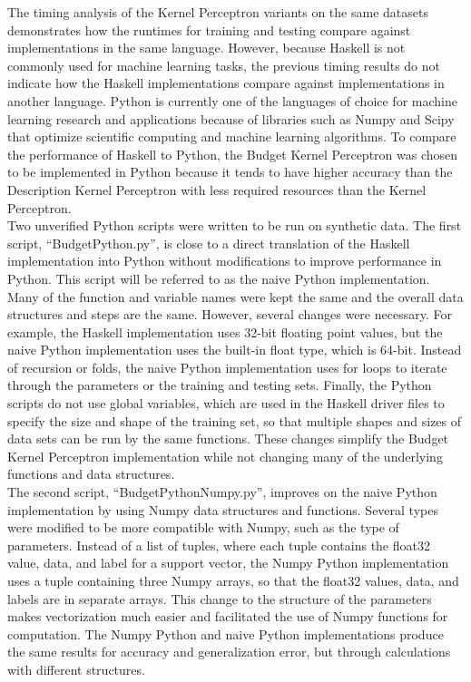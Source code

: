 The timing analysis of the Kernel Perceptron variants on the same datasets demonstrates how the runtimes for training and testing compare against implementations in the same language. However, because Haskell is not commonly used for machine learning tasks, the previous timing results do not indicate how the Haskell implementations compare against implementations in another language. Python is currently one of the languages of choice for machine learning research and applications because of libraries such as Numpy and Scipy that optimize scientific computing and machine learning algorithms. To compare the performance of Haskell to Python, the Budget Kernel Perceptron was chosen to be implemented in Python because it tends to have higher accuracy than the Description Kernel Perceptron with less required resources than the Kernel Perceptron. 
\\Two unverified Python scripts were written to be run on synthetic data. The first script, ``BudgetPython.py'', is close to a direct translation of the Haskell implementation into Python without modifications to improve performance in Python. This script will be referred to as the naive Python implementation. Many of the function and variable names were kept the same and the overall data structures and steps are the same. However, several changes were necessary. For example, the Haskell implementation uses 32-bit floating point values, but the naive Python implementation uses the built-in float type, which is 64-bit. Instead of recursion or folds, the naive Python implementation uses for loops to iterate through the parameters or the training and testing sets. Finally, the Python scripts do not use global variables, which are used in the Haskell driver files to specify the size and shape of the training set, so that multiple shapes and sizes of data sets can be run by the same functions. These changes simplify the Budget Kernel Perceptron implementation while not changing many of the underlying functions and data structures.
\\The second script, ``BudgetPythonNumpy.py'', improves on the naive Python implementation by using Numpy data structures and functions. Several types were modified to be more compatible with Numpy, such as the type of parameters. Instead of a list of tuples, where each tuple contains the float32 value, data, and label for a support vector, the Numpy Python implementation uses a tuple containing three Numpy arrays, so that the float32 values, data, and labels are in separate arrays. This change to the structure of the parameters makes vectorization much easier and facilitated the use of Numpy functions for computation. The Numpy Python and naive Python implementations produce the same results for accuracy and generalization error, but through calculations with different structures.
